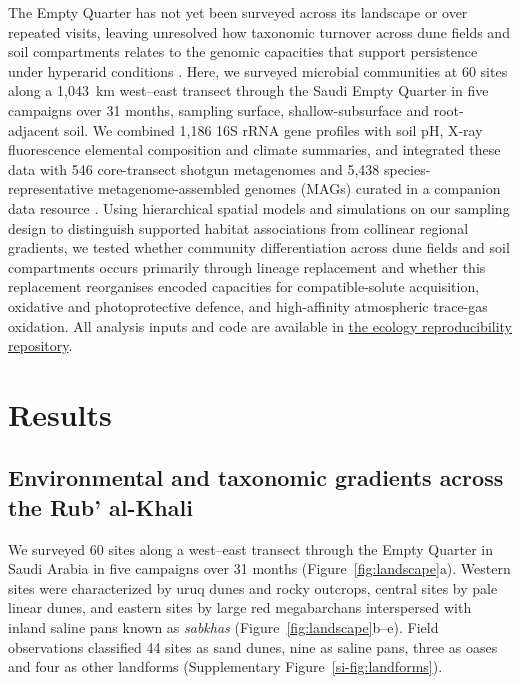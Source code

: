 \documentclass[fleqn,10pt,numbers]{olplainarticle}
\begin{document}
The Empty Quarter has not yet been surveyed across its landscape or over repeated visits, leaving unresolved how taxonomic turnover across dune fields and soil compartments relates to the genomic capacities that support persistence under hyperarid conditions \cite{ji2017atmospheric,cordero2019atmospheric,bay2021trace,bay2021aridity,ayalaortiz2025arid}. Here, we surveyed microbial communities at 60 sites along a 1,043~km west--east transect through the Saudi Empty Quarter in five campaigns over 31 months, sampling surface, shallow-subsurface and root-adjacent soil. We combined 1,186 16S rRNA gene profiles with soil pH, X-ray fluorescence elemental composition and climate summaries, and integrated these data with 546 core-transect shotgun metagenomes and 5,438 species-representative metagenome-assembled genomes (MAGs) curated in a companion data resource \cite{rubalkhali_datapaper}. Using hierarchical spatial models and simulations on our sampling design to distinguish supported habitat associations from collinear regional gradients, we tested whether community differentiation across dune fields and soil compartments occurs primarily through lineage replacement and whether this replacement reorganises encoded capacities for compatible-solute acquisition, oxidative and photoprotective defence, and high-affinity atmospheric trace-gas oxidation. All analysis inputs and code are available in \href{https://github.com/bio-ontology-research-group/empty-quarter-ecology}{the ecology reproducibility repository}.

\section*{Results}\label{sec2}

\subsection*{Environmental and taxonomic gradients across the Rub' al-Khali}
We surveyed 60 sites along a west--east transect through the Empty Quarter in Saudi Arabia in five campaigns over 31 months (Figure~\ref{fig:landscape}a). Western sites were characterized by uruq dunes and rocky outcrops, central sites by pale linear dunes, and eastern sites by large red megabarchans interspersed with inland saline pans known as \textit{sabkhas} (Figure~\ref{fig:landscape}b--e). Field observations classified 44 sites as sand dunes, nine as saline pans, three as oases and four as other landforms (Supplementary Figure~\ref{si-fig:landforms}).
\end{document}
